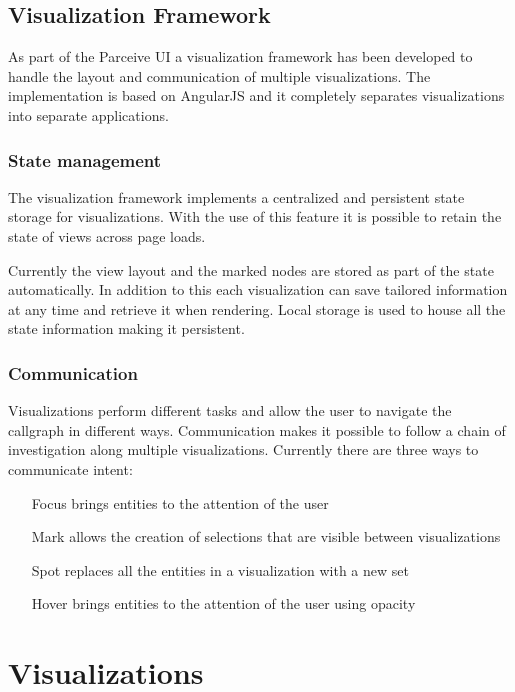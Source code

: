 \documentclass[conference]{IEEEtran}
\begin{document}
\subsection{Visualization Framework}

As part of the Parceive UI a visualization framework has been developed to handle the layout and communication of multiple visualizations. The implementation is based on AngularJS and it completely separates visualizations into separate applications.

\subsubsection{State management}

The visualization framework implements a centralized and persistent state storage for visualizations. With the use of this feature it is possible to retain the state of views across page loads.

Currently the view layout and the marked nodes are stored as part of the state automatically. In addition to this each visualization can save tailored information at any time and retrieve it when rendering. Local storage is used to house all the state information making it persistent.

\subsubsection{Communication}

Visualizations perform different tasks and allow the user to navigate the callgraph in different ways. Communication makes it possible to follow a chain of investigation along multiple visualizations. Currently there are three ways to communicate intent:

\begin{itemize}
	\item[Focus] brings entities to the attention of the user
	\item[Mark] allows the creation of selections that are visible between visualizations
	\item[Spot] replaces all the entities in a visualization with a new set
	\item[Hover] brings entities to the attention of the user using opacity
\end{itemize}


\section{Visualizations}
\end{document}

